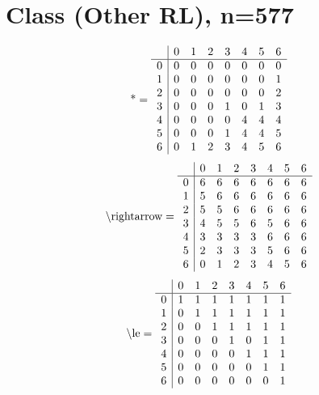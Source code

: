 \documentclass[11pt]{article}
\begin{document}
\section{Class (Other RL), n=577}
\[\text{*} = 
\begin{array}{r | r r r r r r r}
 & 0 & 1 & 2 & 3 & 4 & 5 & 6 \\ \hline
0 & 0 & 0 & 0 & 0 & 0 & 0 & 0 \\
1 & 0 & 0 & 0 & 0 & 0 & 0 & 1 \\
2 & 0 & 0 & 0 & 0 & 0 & 0 & 2 \\
3 & 0 & 0 & 0 & 1 & 0 & 1 & 3 \\
4 & 0 & 0 & 0 & 0 & 4 & 4 & 4 \\
5 & 0 & 0 & 0 & 1 & 4 & 4 & 5 \\
6 & 0 & 1 & 2 & 3 & 4 & 5 & 6 \\
\end{array}
\]
\[\text{\textbackslash rightarrow} = 
\begin{array}{r | r r r r r r r}
 & 0 & 1 & 2 & 3 & 4 & 5 & 6 \\ \hline
0 & 6 & 6 & 6 & 6 & 6 & 6 & 6 \\
1 & 5 & 6 & 6 & 6 & 6 & 6 & 6 \\
2 & 5 & 5 & 6 & 6 & 6 & 6 & 6 \\
3 & 4 & 5 & 5 & 6 & 5 & 6 & 6 \\
4 & 3 & 3 & 3 & 3 & 6 & 6 & 6 \\
5 & 2 & 3 & 3 & 3 & 5 & 6 & 6 \\
6 & 0 & 1 & 2 & 3 & 4 & 5 & 6 \\
\end{array}
\]
\[\text{\textbackslash le} = 
\begin{array}{r | r r r r r r r}
 & 0 & 1 & 2 & 3 & 4 & 5 & 6 \\ \hline
0 & 1 & 1 & 1 & 1 & 1 & 1 & 1 \\
1 & 0 & 1 & 1 & 1 & 1 & 1 & 1 \\
2 & 0 & 0 & 1 & 1 & 1 & 1 & 1 \\
3 & 0 & 0 & 0 & 1 & 0 & 1 & 1 \\
4 & 0 & 0 & 0 & 0 & 1 & 1 & 1 \\
5 & 0 & 0 & 0 & 0 & 0 & 1 & 1 \\
6 & 0 & 0 & 0 & 0 & 0 & 0 & 1 \\
\end{array}
\]
\end{document}
